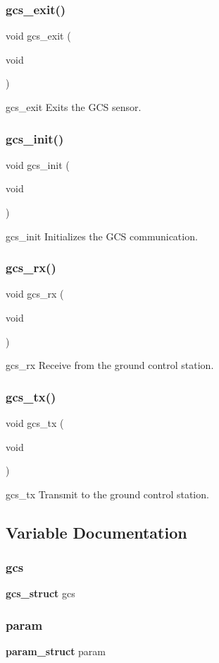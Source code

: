 \subsubsection{gcs\+\_\+exit()}
{\footnotesize\ttfamily void gcs\+\_\+exit (\begin{DoxyParamCaption}\item[{void}]{ }\end{DoxyParamCaption})}

gcs\+\_\+exit Exits the G\+CS sensor. \mbox{\label{gcs_8h_a9b733311664e0b3d20db4dbbf766df43}} 
\subsubsection{gcs\+\_\+init()}
{\footnotesize\ttfamily void gcs\+\_\+init (\begin{DoxyParamCaption}\item[{void}]{ }\end{DoxyParamCaption})}

gcs\+\_\+init Initializes the G\+CS communication. \mbox{\label{gcs_8h_ae2602edc0d4dab57bcccbb7c9feb4dfd}} 
\subsubsection{gcs\+\_\+rx()}
{\footnotesize\ttfamily void gcs\+\_\+rx (\begin{DoxyParamCaption}\item[{void}]{ }\end{DoxyParamCaption})}

gcs\+\_\+rx Receive from the ground control station. \mbox{\label{gcs_8h_a44198c4ef9397140234bf464ed6c784a}} 
\subsubsection{gcs\+\_\+tx()}
{\footnotesize\ttfamily void gcs\+\_\+tx (\begin{DoxyParamCaption}\item[{void}]{ }\end{DoxyParamCaption})}

gcs\+\_\+tx Transmit to the ground control station. 

\subsection{Variable Documentation}
\mbox{\label{gcs_8h_ac7cc1bf00f0e3dc0d9db27a74490ef81}} 
\subsubsection{gcs}
{\footnotesize\ttfamily \textbf{ gcs\+\_\+struct} gcs}

\mbox{\label{gcs_8h_a9d948b18537e6c8c6ef61b023bc70180}} 
\subsubsection{param}
{\footnotesize\ttfamily \textbf{ param\+\_\+struct} param}

